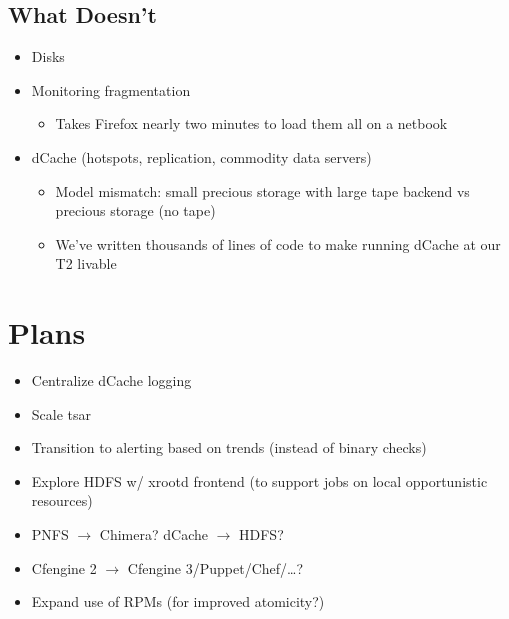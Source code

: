 \documentclass{beamer}
\begin{document}
\subsection{What Doesn't}
\begin{frame}
\begin{itemize}
	\item Disks
	\item Monitoring fragmentation
	\begin{itemize}
		\item Takes Firefox nearly two minutes to load them all on a netbook
	\end{itemize}
	\item dCache (hotspots, replication, commodity data servers)
	\begin{itemize}
		\item Model mismatch: small precious storage with large tape backend vs precious storage (no tape)
		\item We've written thousands of lines of code to make running dCache at our T2 livable
	\end{itemize}
\end{itemize}
\end{frame}

\section{Plans}
\begin{frame}
\begin{itemize}
	\item Centralize dCache logging
	\item Scale tsar
	\item Transition to alerting based on trends (instead of binary checks)
	\item Explore HDFS w/ xrootd frontend (to support jobs on local opportunistic resources)
	\item PNFS $\rightarrow$ Chimera? dCache $\rightarrow$ HDFS?
	\item Cfengine 2 $\rightarrow$ Cfengine 3/Puppet/Chef/\ldots{}?
	\item Expand use of RPMs (for improved atomicity?)
\end{itemize}
\end{frame}
\end{document}
